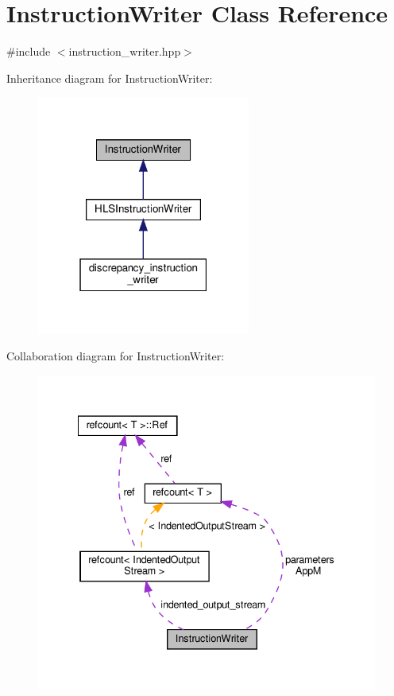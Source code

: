 \hypertarget{classInstructionWriter}{}\section{Instruction\+Writer Class Reference}
\label{classInstructionWriter}


{\ttfamily \#include $<$instruction\+\_\+writer.\+hpp$>$}



Inheritance diagram for Instruction\+Writer\+:
\nopagebreak
\begin{figure}[H]
\begin{center}
\leavevmode
\includegraphics[width=199pt]{d2/db5/classInstructionWriter__inherit__graph}
\end{center}
\end{figure}


Collaboration diagram for Instruction\+Writer\+:
\nopagebreak
\begin{figure}[H]
\begin{center}
\leavevmode
\includegraphics[width=335pt]{d9/dfc/classInstructionWriter__coll__graph}
\end{center}
\end{figure}
